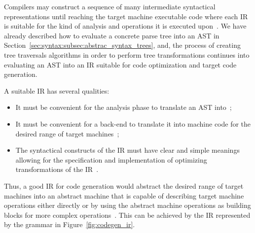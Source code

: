 \documentclass[
  oneside,
  english,
  coorientadorbanca,
  noabntexcite
]{ufsc-thesis-rn46-2019}
\begin{document}
Compilers may construct a sequence of many intermediate syntactical representations until reaching the target machine executable code where each IR is suitable for the kind of analysis and operations it is executed upon~\cite{Aho:2006:CPT:1177220}.
We have already described how to evaluate a concrete parse tree into an AST in Section~\ref{sec:syntax:subsec:abstrac_syntax_trees}, and, the process of creating tree traversals algorithms in order to perform tree transformations continues into evaluating an AST into an IR suitable for code optimization and target code generation.

A suitable IR has several qualities:
\begin{itemize}
  \item It must be convenient for the analysis phase to translate an AST into~\cite{appel2003modern};
  \item It must be convenient for a back-end to translate it into machine code for the desired range of target machines~\cite{appel2003modern};
  \item The syntactical constructs of the IR must have clear and simple meanings allowing for the specification and implementation of optimizing transformations of the IR~\cite{appel2003modern}.
\end{itemize}
Thus, a good IR for code generation would abstract the desired range of target machines into an abstract machine that is capable of describing target machine operations either directly or by using the abstract machine operations as building blocks for more complex operations~\cite{appel2003modern}.
This can be achieved by the IR represented by the grammar in Figure~\ref{fig:codegen_ir}.
\end{document}
